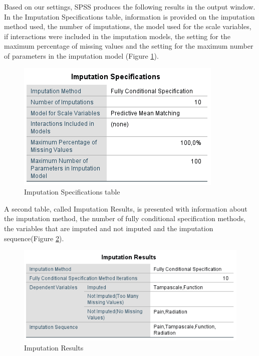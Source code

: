 \documentclass[]{book}
\begin{document}
Based on our settings, SPSS produces the following results in the output
window. In the Imputation Specifications table, information is provided
on the imputation method used, the number of imputations, the model used
for the scale variables, if interactions were included in the imputation
models, the setting for the maximum percentage of missing values and the
setting for the maximum number of parameters in the imputation model
(Figure \ref{fig:tab4-4}).

\begin{figure}

{\centering \includegraphics[width=0.9\linewidth]{images/tab4.4} 

}

\caption{Imputation Specifications table}\label{fig:tab4-4}
\end{figure}

A second table, called Imputation Results, is presented with information
about the imputation method, the number of fully conditional
specification methods, the variables that are imputed and not imputed
and the imputation sequence(Figure \ref{fig:tab4-5}).

\begin{figure}

{\centering \includegraphics[width=0.9\linewidth]{images/tab4.5} 

}

\caption{Imputation Results}\label{fig:tab4-5}
\end{figure}
\end{document}
